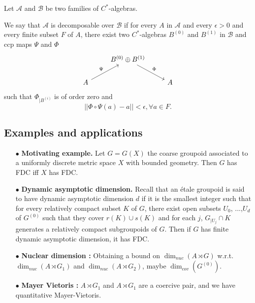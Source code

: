 Let $\mathcal A$ and $\mathcal B$ be two families of $C^*$-algebras.

\begin{definition}
We say that $\mathcal A$ is decomposable over $\mathcal B$ if for every $A$ in $\mathcal A$ and every $\epsilon>0$ and every finite subset $F$ of $A$, there exist two $C^*$-algebras $B^{(0)}$ and $B^{(1)}$ in $\mathcal B$ and ccp maps $\Psi$ and $\Phi$ 
\[\begin{tikzcd}
 \ & B^{(0)}\oplus B^{(1)} \arrow{dr}{\Phi} & \ \\
A \arrow{ur}{\Psi} & \ & A
\end{tikzcd}\]
such that $\Phi_{|B^{(i)}}$ is of order zero and 
\[||\Phi\circ \Psi (a)-a||<\epsilon,\forall a\in F. \]
\end{definition}

\subsection{Examples and applications}

\begin{itemize}
\item[$\bullet$] \textbf{Motivating example.} Let $G=G(X)$ the coarse groupoid associated to a uniformly discrete metric space $X$ with bounded geometry. Then $G$ has FDC iff $X$ has FDC.\\
\item[$\bullet$] \textbf{Dynamic asymptotic dimension.} Recall that an étale groupoid is said to have dynamic asymptotic dimension $d$ if it is the smallest integer such that for every relatively compact subset $K$ of $G$, there exist open subsets $U_0$, ...,$U_d$ of $G^{(0)}$ such that they cover $r(K)\cup s(K)$ and for each $j$, $G_{|U_j}\cap K$ generates a relatively compact subgroupoids of $G$. Then if $G$ has finite dynamic asymptotic dimension, it has FDC. 

\item[$\bullet$] \textbf{Nuclear dimension :} Obtaining a bound on $\dim_{nuc}(A\rtimes G)$ w.r.t. $\dim_{nuc} (A\rtimes G_1)$ and $\dim_{nuc} (A\rtimes G_2)$, maybe $\dim_{cov}(G^{(0)})$.
\item[$\bullet$] \textbf{Mayer Vietoris :} $A\rtimes G_1$ and $A\rtimes G_1$ are a coercive pair, and we have quantitative Mayer-Vietoris. 
\end{itemize}




